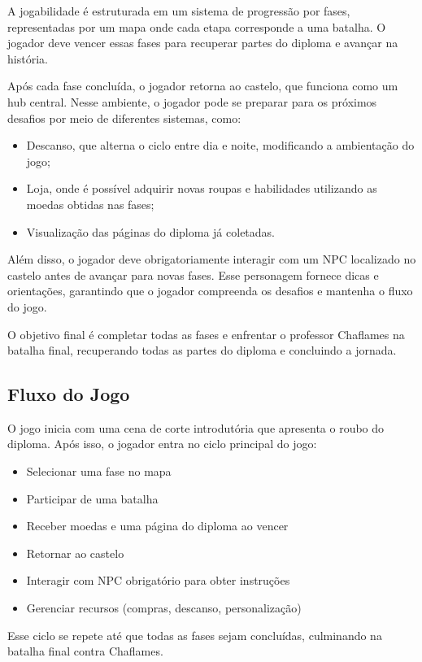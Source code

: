 \documentclass[12pt,a4paper]{article}
\begin{document}
A jogabilidade é estruturada em um sistema de progressão por fases, representadas por um mapa onde cada etapa corresponde a uma batalha. O jogador deve vencer essas fases para recuperar partes do diploma e avançar na história.

Após cada fase concluída, o jogador retorna ao castelo, que funciona como um hub central. Nesse ambiente, o jogador pode se preparar para os próximos desafios por meio de diferentes sistemas, como:
\begin{itemize}
\item Descanso, que alterna o ciclo entre dia e noite, modificando a ambientação do jogo;
\item Loja, onde é possível adquirir novas roupas e habilidades utilizando as moedas obtidas nas fases;
\item Visualização das páginas do diploma já coletadas.
\end{itemize}

Além disso, o jogador deve obrigatoriamente interagir com um NPC localizado no castelo antes de avançar para novas fases. Esse personagem fornece dicas e orientações, garantindo que o jogador compreenda os desafios e mantenha o fluxo do jogo.

O objetivo final é completar todas as fases e enfrentar o professor Chaflames na batalha final, recuperando todas as partes do diploma e concluindo a jornada.

\subsection*{Fluxo do Jogo}

O jogo inicia com uma cena de corte introdutória que apresenta o roubo do diploma.
Após isso, o jogador entra no ciclo principal do jogo:

\begin{itemize}
\item Selecionar uma fase no mapa
\item Participar de uma batalha
\item Receber moedas e uma página do diploma ao vencer
\item Retornar ao castelo
\item Interagir com NPC obrigatório para obter instruções
\item Gerenciar recursos (compras, descanso, personalização)
\end{itemize}

Esse ciclo se repete até que todas as fases sejam concluídas, culminando na batalha final
contra Chaflames.
\end{document}
